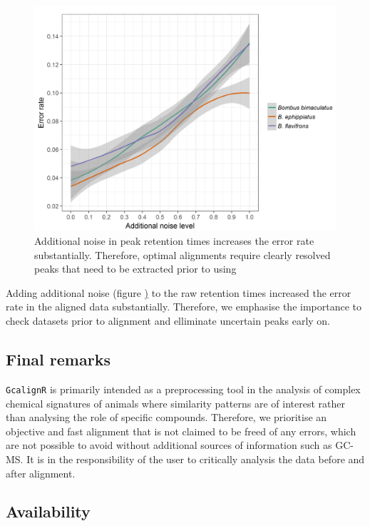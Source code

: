 \begin{figure}[htbp]
\centering
\includegraphics[width=13cm]{figures/noise_simulation}
\caption{Additional noise in peak retention times increases the error rate substantially. Therefore, optimal alignments require clearly resolved peaks that need to be extracted prior to using }
\label{figure:noise}
\end{figure}

Adding additional noise (figure \href{figure:noise}) to the raw
retention times increased the error rate in the aligned data
substantially. Therefore, we emphasise the importance to check datasets
prior to alignment and elliminate uncertain peaks early on.

\subsection{Final remarks}\label{final-remarks}

\texttt{GcalignR} is primarily intended as a preprocessing tool in the
analysis of complex chemical signatures of animals where similarity
patterns are of interest rather than analysing the role of specific
compounds. Therefore, we prioritise an objective and fast alignment that
is not claimed to be freed of any errors, which are not possible to
avoid without additional sources of information such as GC-MS. It is in
the responsibility of the user to critically analysis the data before
and after alignment.

\subsection{Availability}\label{availability}

